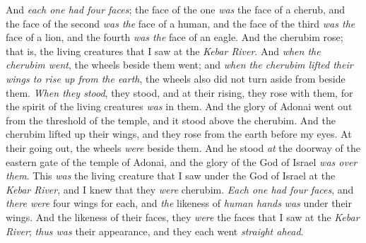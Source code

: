 \begin{biblechapter}
\verse And \textit{each one had four faces}; the face of the one \textit{was} the face of a cherub, and the face of the second \textit{was the} face of a human, and the face of the third \textit{was the} face of a lion, and the fourth \textit{was the} face of an eagle.
\verse And the cherubim rose; that is, the living creatures that I saw at the \textit{Kebar River}.
\verse And \textit{when the cherubim went}, the wheels beside them went; and \textit{when the cherubim lifted their wings to rise up from the earth}, the wheels also did not turn aside from beside them.
\verse \textit{When they stood}, they stood, and at their rising, they rose with them, for the spirit of the living creatures \textit{was} in them.
\verse And the glory of Adonai went out from the threshold of the temple, and it stood above the cherubim.
\verse And the cherubim lifted up their wings, and they rose from the earth before my eyes. At their going out, the wheels \textit{were} beside them. And he stood \textit{at} the doorway of the eastern gate of the temple of Adonai, and the glory of the God of Israel \textit{was over them}.
\verse This \textit{was} the living creature that I saw under the God of Israel at the \textit{Kebar River}, and I knew that they \textit{were} cherubim.
\verse \textit{Each one had four faces}, and \textit{there were} four wings for each, and \textit{the} likeness of \textit{human hands} \textit{was} under their wings.
\verse And the likeness of their faces, they \textit{were} the faces that I saw at the \textit{Kebar River}; \textit{thus was} their appearance, and they each went \textit{straight ahead}.
\end{biblechapter}

